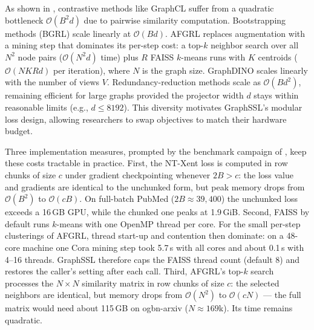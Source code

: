 \documentclass[conference]{IEEEtran}
\begin{document}
As shown in , contrastive methods like GraphCL suffer from a quadratic bottleneck $\mathcal{O}(B^2 d)$ due to pairwise similarity computation. Bootstrapping methods (BGRL) scale linearly at $\mathcal{O}(B d)$. AFGRL replaces augmentation with a mining step that dominates its per-step cost: a top-$k$ neighbor search over all $N^2$ node pairs ($\mathcal{O}(N^2 d)$ time) plus $R$ FAISS $k$-means runs with $K$ centroids ($\mathcal{O}(NKRd)$ per iteration), where $N$ is the graph size. GraphDINO scales linearly with the number of views $V$. Redundancy-reduction methods scale as $\mathcal{O}(B d^2)$, remaining efficient for large graphs provided the projector width $d$ stays within reasonable limits (e.g., $d \le 8192$). This diversity motivates GraphSSL's modular loss design, allowing researchers to swap objectives to match their hardware budget.

Three implementation measures, prompted by the benchmark campaign of , keep these costs tractable in practice. First, the NT-Xent loss is computed in row chunks of size $c$ under gradient checkpointing whenever $2B > c$: the loss value and gradients are identical to the unchunked form, but peak memory drops from $\mathcal{O}(B^2)$ to $\mathcal{O}(cB)$. On full-batch PubMed ($2B \approx 39{,}400$) the unchunked loss exceeds a 16\,GB GPU, while the chunked one peaks at 1.9\,GiB. Second, FAISS by default runs $k$-means with one OpenMP thread per core. For the small per-step clusterings of AFGRL, thread start-up and contention then dominate: on a 48-core machine one Cora mining step took 5.7\,s with all cores and about 0.1\,s with 4--16 threads. GraphSSL therefore caps the FAISS thread count (default 8) and restores the caller's setting after each call. Third, AFGRL's top-$k$ search processes the $N \times N$ similarity matrix in row chunks of size $c$: the selected neighbors are identical, but memory drops from $\mathcal{O}(N^2)$ to $\mathcal{O}(cN)$ --- the full matrix would need about 115\,GB on ogbn-arxiv ($N \approx 169$k). Its time remains quadratic.
\end{document}
